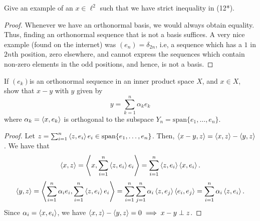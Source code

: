 \begin{question}
    Give an example of an $x \in \ell^2$ such that we have strict inequality in (12*).
    \label{section3.4-4}
\end{question}
\begin{proof}
    Whenever we have an orthonormal basis, we would always obtain equality. Thus, finding an orthonormal sequence that is not a basis suffices. A very nice example (found on the internet) was $(e_n) = \delta_{2n}$, i.e, a sequence which has a $1$ in $2n$th position, zero elsewhere, and cannot express the sequences which contain non-zero elements in the odd positions, and hence, is not a basis.
\end{proof}

\begin{question}
    If $(e_k)$is an orthonormal sequence in an inner product space $X$, and $x \in X$, show that $x- y$ with $y$ given by
    \[y = \sum_{k=1}^n \alpha_k e_k\]
    where $\alpha_k= \left\langle x , e_k \right\rangle$ is orthogonal to the subspace $Y_n = \textrm{span}\{e_1 , \ldots , e_n\}$.
    \label{section3.4-5}
\end{question}
\begin{proof}
    Let $z = \sum_{i=1}^n \left\langle z , e_i \right\rangle e_i \in \textrm{span}\{e_1 , \ldots  , e_n\}$. Then, $\left\langle x-y , z \right\rangle = \left\langle x , z \right\rangle - \left\langle y , z \right\rangle$. We have that
    \[\left\langle x , z \right\rangle = \left\langle x , \sum_{i=1}^n \left\langle z , e_i \right\rangle e_i \right\rangle = \sum_{i=1}^n \left\langle z , e_i \right\rangle \left\langle x , e_i \right\rangle.\]
    \[\left\langle y , z \right\rangle = \left\langle \sum_{i=1}^n\alpha_i e_i , \sum_{i=1}^n \left\langle z , e_i \right\rangle e_i \right\rangle = \sum_{i=1}^n \sum_{j=1}^n \alpha_i \left\langle z , e_j \right\rangle \left\langle e_i , e_j \right\rangle = \sum_{i=1}^n \alpha_i \left\langle z , e_i \right\rangle.\]
    Since $\alpha_i = \left\langle x , e_i \right\rangle$, we have $\left\langle x , z \right\rangle - \left\langle y , z \right\rangle = 0 \implies x-y \perp z$.
    
\end{proof}

